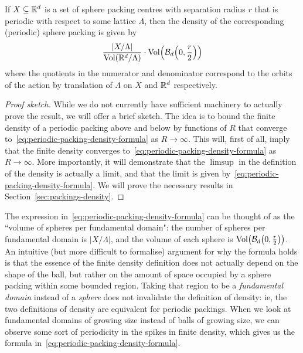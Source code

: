 \begin{lemma}\label{SpherePacking.density of periodic packing}\notready
  If $X \subseteq \mathbb{R}^d$ is a set of sphere packing centres with separation radius $r$ that is periodic with respect to some lattice $\Lambda$, then the density of the corresponding (periodic) sphere packing is given by
  \begin{equation}
    \frac{\left\lvert X/\Lambda \right\rvert}{\operatorname{Vol}\!\left(\mathbb{R}^d / \Lambda\right)} \cdot \operatorname{Vol}\!\left(\mathcal{B}_d\!\left(0, \frac{r}{2}\right)\right)
    \label{eq:periodic-packing-density-formula}
  \end{equation}
  where the quotients in the numerator and denominator correspond to the orbits of the action by translation of $\Lambda$ on $X$ and $\mathbb{R}^d$ respectively.
\end{lemma}
\begin{proof}[Proof sketch]
  While we do not currently have sufficient machinery to actually prove the result, we will offer a brief sketch. The idea is to bound the finite density of a periodic packing above and below by functions of $R$ that converge to~\eqref{eq:periodic-packing-density-formula} as $R \to \infty$. This will, first of all, imply that the finite density converges to~\eqref{eq:periodic-packing-density-formula} as $R \to \infty$. More importantly, it will demonstrate that the $\limsup$ in the definition of the density is actually a limit, and that the limit is given by~\eqref{eq:periodic-packing-density-formula}. We will prove the necessary results in Section~\ref{sec:packings-density}.
\end{proof}

\begin{remark}
  The expression in~\eqref{eq:periodic-packing-density-formula} can be thought of as the ``volume of spheres per fundamental domain": the number of spheres per fundamental domain is $\lvert {X/\Lambda} \rvert$, and the volume of each sphere is $\operatorname{Vol}\!\left(\mathcal{B}_d\!\left(0, \frac{r}{2}\right)\right)$. An intuitive (but more difficult to formalise) argument for why the formula holds is that the essence of the finite density definition does not actually depend on the shape of the ball, but rather on the amount of space occupied by a sphere packing within some bounded region. Taking that region to be a \emph{fundamental domain} instead of a \emph{sphere} does not invalidate the definition of density: ie, the two definitions of density are equivalent for periodic packings. When we look at fundamental domains of growing size instead of balls of growing size, we can observe some sort of periodicity in the spikes in finite density, which gives us the formula in~\eqref{eq:periodic-packing-density-formula}.
\end{remark}

